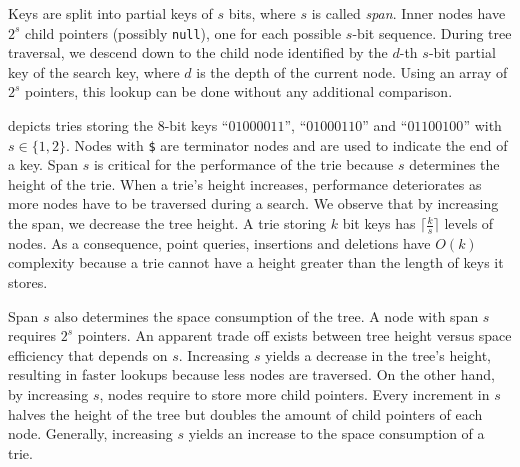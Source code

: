 \documentclass[abstracton,12pt]{scrartcl}
\theoremstyle{definition}
\begin{document}
Keys are split into partial keys of $s$ bits, where $s$ is called 
\textit{span}. Inner nodes have  $2^s$ child pointers 
(possibly \texttt{null}), one for each possible $s$-bit sequence. During tree
traversal, we descend down to the child node identified by the $d$-th
$s$-bit partial key of the search key, where $d$ is the depth of the current 
node.  Using an array of $2^s$  pointers, this lookup can be done without any 
additional comparison. 

 depicts tries storing the 
8-bit keys ``$01000011$'', ``$01000110$'' and ``$01100100$'' with 
$s \in \{1,2\}$. Nodes with \texttt{\$} are terminator nodes and are used
to indicate the end of a key. Span $s$ is critical for the performance of the 
trie because $s$ determines the height of the trie. When a trie's height
increases, performance deteriorates as more nodes have to be traversed during
a search. We observe that by increasing the span, we decrease the tree height. 
A trie storing $k$ bit keys has $\lceil \frac{k}{s} \rceil$ levels of nodes.
As a consequence, point queries, insertions and deletions have 
$O(k)$ complexity because a trie cannot have a height greater than the length
of keys it stores.

Span $s$ also determines the space consumption of the tree.
A node with span $s$ requires $2^s$ pointers. 
An apparent trade off exists between tree height versus space efficiency that
depends on $s$. Increasing $s$ yields a decrease in the tree's height, 
resulting in faster lookups because less nodes are traversed. On the other
hand, by increasing $s$, nodes require to store more child pointers. Every
increment in $s$ halves the height of the tree but doubles the amount of 
child pointers of each node. Generally, increasing $s$ yields an increase to
the space consumption of a trie.
\end{document}
